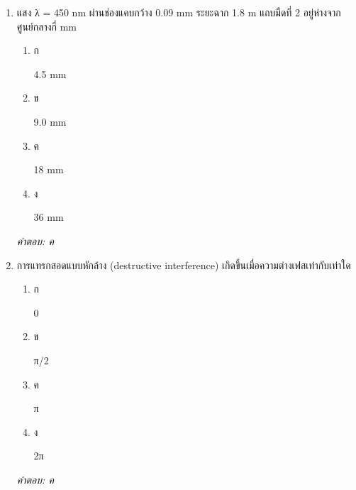 \documentclass[12pt]{article}
\begin{document}
\begin{enumerate}[label=\arabic*., itemsep=0.5\baselineskip, topsep=0.5\baselineskip, leftmargin=*]
\item แสง λ = 450 nm ผ่านช่องแคบกว้าง 0.09 mm ระยะฉาก 1.8 m แถบมืดที่ 2 อยู่ห่างจากศูนย์กลางกี่ mm
\begin{enumerate}[label=\alph*)., itemsep=0.3\baselineskip, topsep=0.3\baselineskip]
\item ก\ 
\begin{minipage}[t]{0.9\linewidth}
\raggedright 4.5 mm
\end{minipage}
\item ข\ 
\begin{minipage}[t]{0.9\linewidth}
\raggedright 9.0 mm
\end{minipage}
\item ค\ 
\begin{minipage}[t]{0.9\linewidth}
\raggedright 18 mm
\end{minipage}
\item ง\ 
\begin{minipage}[t]{0.9\linewidth}
\raggedright 36 mm
\end{minipage}
\end{enumerate}
\vspace{-0.3\baselineskip}
\begin{small}
\textit{คำตอบ: ค}
\end{small}

\item การแทรกสอดแบบหักล้าง (destructive interference) เกิดขึ้นเมื่อความต่างเฟสเท่ากับเท่าใด
\begin{enumerate}[label=\alph*)., itemsep=0.3\baselineskip, topsep=0.3\baselineskip]
\item ก\ 
\begin{minipage}[t]{0.9\linewidth}
\raggedright 0
\end{minipage}
\item ข\ 
\begin{minipage}[t]{0.9\linewidth}
\raggedright π/2
\end{minipage}
\item ค\ 
\begin{minipage}[t]{0.9\linewidth}
\raggedright π
\end{minipage}
\item ง\ 
\begin{minipage}[t]{0.9\linewidth}
\raggedright 2π
\end{minipage}
\end{enumerate}
\vspace{-0.3\baselineskip}
\begin{small}
\textit{คำตอบ: ค}
\end{small}


\end{enumerate}
\end{document}
